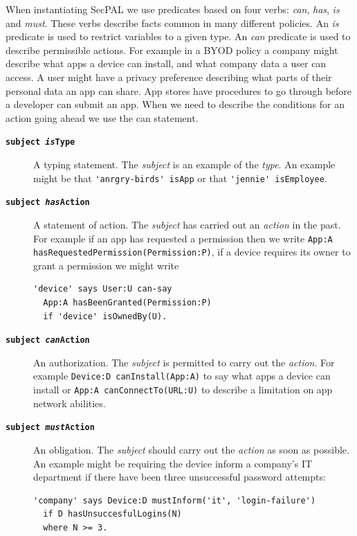 \documentclass[thesis.tex]{subfiles}
\begin{document}
When instantiating SecPAL we use predicates based on four verbs: \emph{can}, \emph{has}, \emph{is} and \emph{must}.
These verbs describe facts common in many different policies.
An \emph{is} predicate is used to restrict variables to a given type.
An \emph{can} predicate is used to describe permissible actions.
For example in a \ac{BYOD} policy a company might describe what apps a device can install, and what company data a user can access.
A user might have a privacy preference describing what parts of their personal data an app can share.
App stores have procedures to go through before a developer can submit an app. 
When we need to describe the conditions for an action going ahead we use the can statement.

\begin{description}
\item[\bfseries\texttt{subject \emph{is}Type}]
  A typing statement.  The \emph{subject} is an example of the \emph{type}.  An
  example might be that \lstinline!'anrgry-birds' isApp! or that
  \lstinline!'jennie' isEmployee!.
\item[\bfseries\texttt{subject \emph{has}Action}]
  A statement of action.  The \emph{subject} has carried out an \emph{action} in
  the past. For example if an app has requested a permission then we write
  \lstinline!App:A hasRequestedPermission(Permission:P)!, if a device requires
  its owner to grant a permission we might write
  \begin{lstlisting}
'device' says User:U can-say
  App:A hasBeenGranted(Permission:P)
  if 'device' isOwnedBy(U).
  \end{lstlisting}
\item[\bfseries\texttt{subject \emph{can}Action}]
  An authorization. The \emph{subject} is permitted to carry out the \emph{action}.
  For example \lstinline!Device:D canInstall(App:A)! to say what apps a device
  can install or \lstinline!App:A canConnectTo(URL:U)! to describe a limitation
  on app network abilities.
\item[\bfseries\texttt{subject \emph{must}Action}]
  An obligation.  The \emph{subject} should carry out the \emph{action} as soon
  as possible.
  An example might be requiring the device inform a company's IT department if
  there have been three unsuccessful password attempts:
  \begin{lstlisting}
'company' says Device:D mustInform('it', 'login-failure')
  if D hasUnsuccesfulLogins(N)
  where N >= 3.
  \end{lstlisting}
\end{description}
\end{document}
